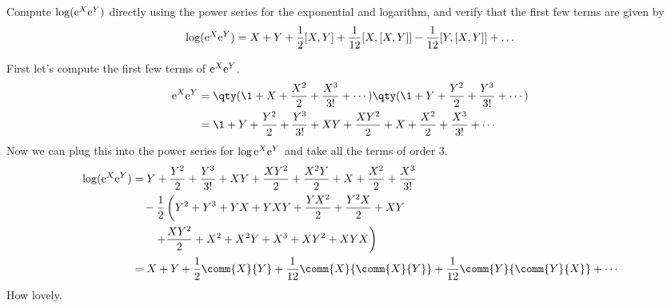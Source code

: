 \documentclass[
	pages,
	boxes,
	color=WildStrawberry
]{homework}
\begin{document}
\begin{problem}
Compute $\log(\mathrm{e}^X \mathrm{e}^Y)$ directly using the power series for the exponential and logarithm, and verify that the first few terms are given by
\[
	\log(\mathrm{e}^X \mathrm{e}^Y) = X + Y + \frac{1}{2}[X, Y] + \frac{1}{12}[X, [X, Y]] - \frac{1}{12}[Y, [X, Y]] + \ldots
\]
\end{problem}

\begin{solution}
	First let's compute the first few terms of $\mathrm{e}^{X}\mathrm{e}^{Y}$.
	\begin{align*}
		\e^{X}\e^{Y} & = \qty(\1 + X + \frac{X^2}{2} + \frac{X^3}{3!} + \cdots)\qty(\1 + Y + \frac{Y^2}{2} + \frac{Y^3}{3!} + \cdots) \\
		             & = \1 + Y + \frac{Y^2}{2} + \frac{Y^3}{3!} + XY + \frac{XY^2}{2} + X + \frac{X^2}{2} + \frac{X^3}{3!} + \cdots
	\end{align*}
	Now we can plug this into the power series for $\log{\mathrm{e}^{X}\mathrm{e}^{Y}}$ and take all the terms of order 3.
	\begin{align*}
		\log(\e^{X}\e^{Y}) & = Y + \frac{Y^2}{2} + \frac{Y^3}{3!} + XY + \frac{XY^2}{2} + \frac{X^2Y}{2} + X + \frac{X^2}{2} + \frac{X^3}{3!}  \\
		                   & \quad - \frac{1}{2}\left(Y^2 + Y^3 + YX + YXY + \frac{YX^2}{2} + \frac{Y^2X}{2} + XY \right.                      \\
		                   & \qquad \left.+ \frac{XY^2}{2} + X^2 + X^2Y + X^3 + XY^2 + XYX\right)                                              \\
		                   & = X + Y + \frac{1}{2}\comm{X}{Y} + \frac{1}{12}\comm{X}{\comm{X}{Y}} + \frac{1}{12}\comm{Y}{\comm{Y}{X}} + \cdots
	\end{align*}
	How lovely.
\end{solution}
\end{document}
